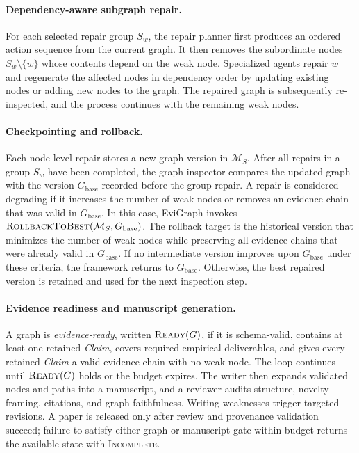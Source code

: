 \documentclass[letterpaper]{article} %
\begin{document}
\paragraph{Dependency-aware subgraph repair.} For each selected repair group $S_w$, the repair planner first produces an ordered action sequence from the current graph. It then removes the subordinate nodes $S_w\setminus\{w\}$ whose contents depend on the weak node. Specialized agents repair $w$ and regenerate the affected nodes in dependency order by updating existing nodes or adding new nodes to the graph. The repaired graph is subsequently re-inspected, and the process continues with the remaining weak nodes. \paragraph{Checkpointing and rollback.} Each node-level repair stores a new graph version in $\mathcal{M}_{S}$. After all repairs in a group $S_w$ have been completed, the graph inspector compares the updated graph with the version $G_{\mathrm{base}}$ recorded before the group repair. A repair is considered degrading if it increases the number of weak nodes or removes an evidence chain that was valid in $G_{\mathrm{base}}$. In this case, EviGraph invokes $\textsc{RollbackToBest}(\mathcal{M}_{S},G_{\mathrm{base}})$. The rollback target is the historical version that minimizes the number of weak nodes while preserving all evidence chains that were already valid in $G_{\mathrm{base}}$. If no intermediate version improves upon $G_{\mathrm{base}}$ under these criteria, the framework returns to $G_{\mathrm{base}}$. Otherwise, the best repaired version is retained and used for the next inspection step.

\paragraph{Evidence readiness and manuscript generation.} A graph is \emph{evidence-ready}, written $\textsc{Ready}(G)$, if it is schema-valid, contains at least one retained \textit{Claim}, covers required empirical deliverables, and gives every retained \textit{Claim} a valid evidence chain with no weak node. The loop continues until $\textsc{Ready}(G)$ holds or the budget expires. The writer then expands validated nodes and paths into a manuscript, and a reviewer audits structure, novelty framing, citations, and graph faithfulness. Writing weaknesses trigger targeted revisions. A paper is released only after review and provenance validation succeed; failure to satisfy either graph or manuscript gate within budget returns the available state with \textsc{Incomplete}.
\end{document}
